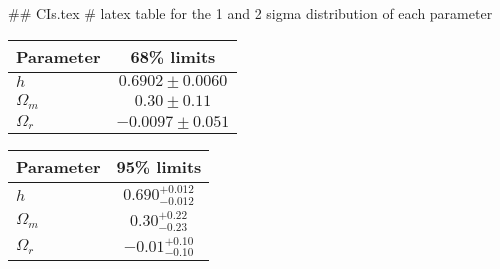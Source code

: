 ## CIs.tex
# latex table for the 1 and 2 sigma distribution of each parameter

\begin{tabular} { l  c}
 Parameter &  68\% limits\\
\hline
{\boldmath$h              $} & $0.6902\pm 0.0060          $\\
{\boldmath$\Omega_m       $} & $0.30\pm 0.11              $\\
{\boldmath$\Omega_r       $} & $-0.0097\pm 0.051          $\\
\hline
\end{tabular}

\begin{tabular} { l  c}
 Parameter &  95\% limits\\
\hline
{\boldmath$h              $} & $0.690^{+0.012}_{-0.012}   $\\
{\boldmath$\Omega_m       $} & $0.30^{+0.22}_{-0.23}      $\\
{\boldmath$\Omega_r       $} & $-0.01^{+0.10}_{-0.10}     $\\
\hline
\end{tabular}
